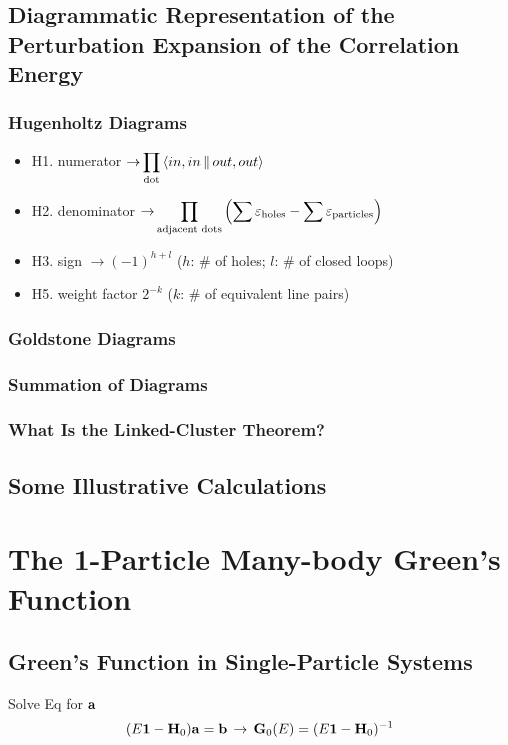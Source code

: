 \documentclass[a4paper]{article}
\DeclareMathOperator{\ra}{\rightarrow}
\newcommand{\iden}{{\large \bm{1}}}
\newcommand{\dis}{\displaystyle}
\numberwithin{equation}{section}
\begin{document}
\subsection{Diagrammatic Representation of the Perturbation Expansion of the Correlation Energy}
\subsubsection{Hugenholtz Diagrams}
\begin{itemize}
	\item H1. numerator  $\ra \dis\prod_{\text{dot}}\Braket{in,in || out,out} $
	\item H2. denominator $\ra \dis\prod_{\text{adjacent dots}}\qty(\sum \varepsilon_{\text{holes}} - \sum \varepsilon_{\text{particles}})  $
	\item H3. sign $ \ra (-1)^{h+l} $ ($ h $: \# of holes; $ l $: \# of closed loops)
	\item H5. weight factor $ 2^{-k} $ ($ k $: \# of equivalent line pairs)
\end{itemize}

\subsubsection{Goldstone Diagrams}

\subsubsection{Summation of Diagrams}

\subsubsection{What Is the Linked-Cluster Theorem?}

\subsection{Some Illustrative Calculations}


\section{The 1-Particle Many-body Green's Function}
\subsection{Green's Function in Single-Particle Systems}
Solve Eq for $ \vb{a} $
\begin{equation}\label{key}
(E\iden - \vb{H}_0) \vb{a} = \vb{b} \;\ra\; \vb{G}_0(E) = (E\iden - \vb{H}_0)^{-1}
\end{equation}
\end{document}

